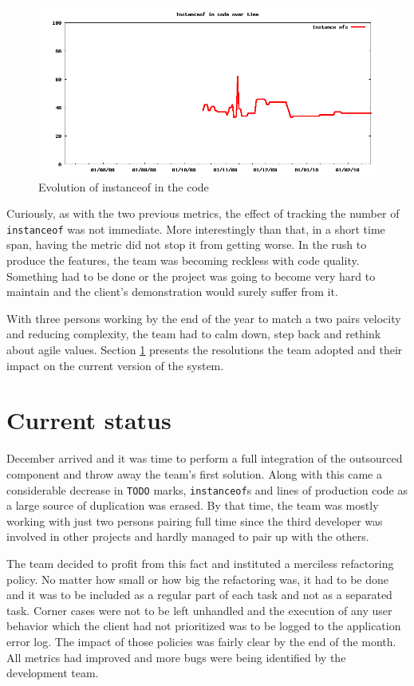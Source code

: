 \documentclass[lnbip]{svmultln}
\begin{document}
\begin{figure}[hbt]
  \centerline{
    \includegraphics[width=120mm]{InstanceOfs}
  }
  \caption{Evolution of instanceof in the code }
  \label{fig:InstanceOfs}
\end{figure}

Curiously, as with the two previous metrics, the effect of tracking
the number of \texttt{instanceof} was not immediate. More
interestingly than that, in a short time span, having the metric did
not stop it from getting worse. In the rush to produce the features,
the team was becoming reckless with code quality.  Something had to be
done or the project was going to become very hard to maintain and the
client's demonstration would surely suffer from it.

With three persons working by the end of the year to match a two pairs
velocity and reducing complexity, the team had to calm down, step back
and rethink about agile values. Section \ref{sec:nowadays} presents
the resolutions the team adopted and their impact on the current
version of the system.

\section{Current status}
\label{sec:nowadays}

December arrived and it was time to perform a full integration of the
outsourced component and throw away the team's first solution. Along
with this came a considerable decrease in \texttt{TODO} marks,
\texttt{instanceof}s and lines of production code as a large source of
duplication was erased. By that time, the team was mostly working with
just two persons pairing full time since the third developer was
involved in other projects and hardly managed to pair up with the
others.

The team decided to profit from this fact and instituted a merciless
refactoring policy. No matter how small or how big the refactoring
was, it had to be done and it was to be included as a regular part of
each task and not as a separated task. Corner cases were not to be
left unhandled and the execution of any user behavior which the client
had not prioritized was to be logged to the application error log. The
impact of those policies was fairly clear by the end of the month. All
metrics had improved and more bugs were being identified by the
development team.
\end{document}
